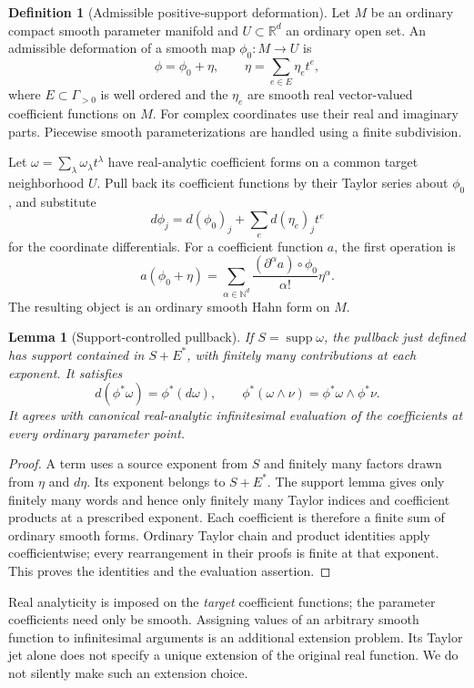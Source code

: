 \documentclass[11pt,letterpaper]{article}
\newtheorem{lemma}[theorem]{Lemma}
\theoremstyle{definition}
\newtheorem{definition}[theorem]{Definition}
\theoremstyle{remark}
\newcommand{\R}{\mathbb R}
\newcommand{\N}{\mathbb N}
\newcommand{\supp}{\operatorname{supp}}
\numberwithin{equation}{section}
\begin{document}
\begin{definition}[Admissible positive-support deformation]\label{def:deformation}
Let $M$ be an ordinary compact smooth parameter manifold and $U\subset\R^d$ an ordinary open set. An admissible deformation of a smooth map $\phi_0:M\to U$ is
\begin{equation}\label{eq:deformation}
\phi=\phi_0+\eta,\qquad
\eta=\sum_{e\in E}\eta_e t^e,
\end{equation}
where $E\subset\Gamma_{>0}$ is well ordered and the $\eta_e$ are smooth real vector-valued coefficient functions on $M$. For complex coordinates use their real and imaginary parts. Piecewise smooth parameterizations are handled using a finite subdivision.
\end{definition}
Let $\omega=\sum_\lambda\omega_\lambda t^\lambda$ have real-analytic coefficient forms on a common target neighborhood $U$. Pull back its coefficient functions by their Taylor series about $\phi_0$, and substitute
\[
d\phi_j=d(\phi_0)_j+\sum_e d(\eta_e)_j t^e
\]
for the coordinate differentials. For a coefficient function $a$, the first operation is
\[
a(\phi_0+\eta)=\sum_{\alpha\in\N^d}
 \frac{(\partial^\alpha a)\circ\phi_0}{\alpha!}\eta^\alpha.
\]
The resulting object is an ordinary smooth Hahn form on $M$.

\begin{lemma}[Support-controlled pullback]\label{lem:pullback}
If $S=\supp\omega$, the pullback just defined has support contained in $S+E^*$, with finitely many contributions at each exponent. It satisfies
\[
d(\phi^*\omega)=\phi^*(d\omega),\qquad
\phi^*(\omega\wedge\nu)=\phi^*\omega\wedge\phi^*\nu.
\]
It agrees with canonical real-analytic infinitesimal evaluation of the coefficients at every ordinary parameter point.
\end{lemma}
\begin{proof}
A term uses a source exponent from $S$ and finitely many factors drawn from $\eta$ and $d\eta$. Its exponent belongs to $S+E^*$. The support lemma gives only finitely many words and hence only finitely many Taylor indices and coefficient products at a prescribed exponent. Each coefficient is therefore a finite sum of ordinary smooth forms. Ordinary Taylor chain and product identities apply coefficientwise; every rearrangement in their proofs is finite at that exponent. This proves the identities and the evaluation assertion.
\end{proof}
Real analyticity is imposed on the \emph{target} coefficient functions; the parameter coefficients need only be smooth. Assigning values of an arbitrary smooth function to infinitesimal arguments is an additional extension problem. Its Taylor jet alone does not specify a unique extension of the original real function. We do not silently make such an extension choice.
\end{document}
